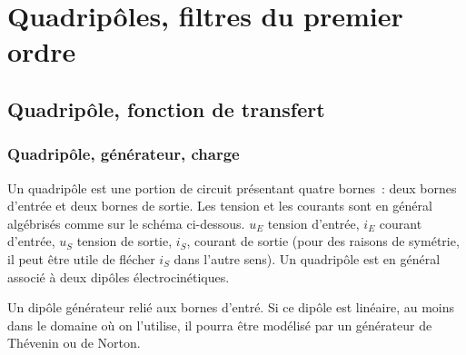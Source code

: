\chapter{Quadripôles, filtres du premier ordre}
\minitoc
\minilof
\minilot

\section{Quadripôle, fonction de transfert}
\subsection{Quadripôle, générateur, charge}
Un quadripôle est une portion de circuit présentant quatre bornes~: deux bornes d'entrée et deux bornes de sortie. Les tension et les courants sont en général algébrisés comme sur le schéma ci-dessous. $u_E$ tension d'entrée, $i_E$ courant d'entrée, $u_S$ tension de sortie, $i_S$, courant de sortie (pour des raisons de symétrie, il peut être utile de flécher $i_S$ dans l'autre sens). Un quadripôle est en général associé à deux dipôles électrocinétiques.

Un dipôle générateur relié aux bornes d'entré. Si ce dipôle est linéaire, au moins dans le domaine où on l'utilise, il pourra être modélisé par un générateur de Thévenin ou de Norton.